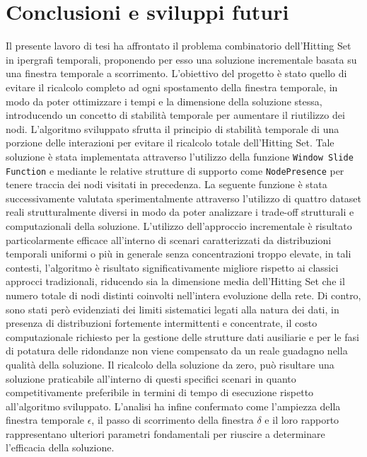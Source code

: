 
\chapter{Conclusioni e sviluppi futuri}\label{cha:conclusioni_e_sviluppi_futuri}

Il presente lavoro di tesi ha affrontato il problema combinatorio dell'Hitting Set in ipergrafi temporali, proponendo per esso una soluzione incrementale basata su una finestra temporale a scorrimento.
L'obiettivo del progetto è stato quello di evitare il ricalcolo completo ad ogni spostamento della finestra temporale, in modo da poter ottimizzare i tempi e la dimensione della soluzione stessa, introducendo un concetto di stabilità temporale per aumentare il riutilizzo dei nodi.
L'algoritmo sviluppato sfrutta il principio di stabilità temporale di una porzione delle interazioni per evitare il ricalcolo totale dell'Hitting Set.
Tale soluzione è stata implementata attraverso l'utilizzo della funzione \texttt{Window Slide Function} e mediante le relative strutture di supporto come \texttt{NodePresence} per tenere traccia dei nodi visitati in precedenza. 
La seguente funzione è stata successivamente valutata sperimentalmente attraverso l'utilizzo di quattro dataset reali strutturalmente diversi in modo da poter analizzare i trade-off strutturali e computazionali della soluzione.
L'utilizzo dell'approccio incrementale è risultato particolarmente efficace all'interno di scenari caratterizzati da distribuzioni temporali uniformi o più in generale senza concentrazioni troppo elevate, in tali contesti, l'algoritmo è risultato significativamente migliore rispetto ai classici approcci tradizionali, riducendo sia la dimensione media dell'Hitting Set che il numero totale di nodi distinti coinvolti nell'intera evoluzione della rete.
Di contro, sono stati però evidenziati dei limiti sistematici legati alla natura dei dati, in presenza di distribuzioni fortemente intermittenti e concentrate, il costo computazionale richiesto per la gestione delle strutture dati ausiliarie e per le fasi di potatura delle ridondanze non viene compensato da un reale guadagno nella qualità della soluzione.
Il ricalcolo della soluzione da zero, può risultare una soluzione praticabile all'interno di questi specifici scenari in quanto competitivamente preferibile in termini di tempo di esecuzione rispetto all'algoritmo sviluppato.
L'analisi ha infine confermato come l'ampiezza della finestra temporale $\epsilon$, il passo di scorrimento della finestra $\delta$ e il loro rapporto rappresentano ulteriori parametri fondamentali per riuscire a determinare l'efficacia della soluzione.

